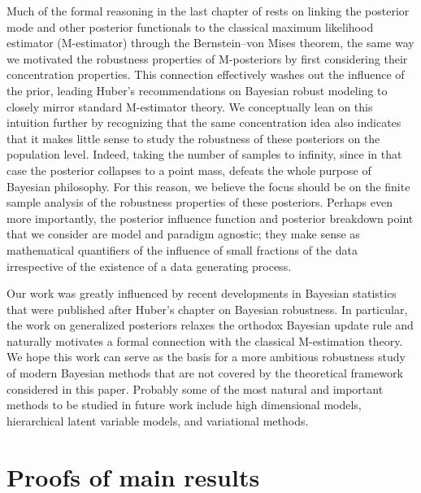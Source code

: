\documentclass[11pt, oneside]{amsart}
\theoremstyle{definition}   %
\begin{document}
Much of the formal reasoning in the last chapter of \cite{huber:ronchetti2009} rests on linking the posterior mode and other posterior functionals to the classical maximum likelihood estimator (M-estimator) through the Bernstein–von Mises theorem, the same way we motivated the robustness properties of M-posteriors by first considering their concentration properties. This connection effectively washes out the influence of the prior, leading Huber's recommendations on Bayesian robust modeling to closely mirror standard M-estimator theory. 
%
We conceptually lean on this intuition further by recognizing that the same concentration idea also indicates that it makes little sense to study the robustness of these posteriors on the population level. Indeed, taking the number of samples to infinity, since in that case the posterior collapses to a point mass, defeats the whole purpose of Bayesian philosophy.  For this reason, we believe the focus should be on the finite sample analysis of the robustness properties of these posteriors.  Perhaps even more importantly, the posterior influence function and posterior breakdown point that we consider are model and paradigm agnostic; they make sense as mathematical quantifiers of the influence of small fractions of the data irrespective of the existence of a data generating process. 

Our work was greatly influenced by recent developments in Bayesian statistics that were published after Huber's chapter on Bayesian robustness. In particular, the work on generalized posteriors \citep{hooker:vidyashankar2014, bissiri:holmes:walker2016, ghosh:basu2016, miller2021,matsubara:knoblauch:briol:oates2022} relaxes the orthodox Bayesian update rule and naturally motivates a formal connection with the classical M-estimation theory.  We hope this work can serve as the basis for a more ambitious robustness study of modern Bayesian methods that are not covered by the theoretical framework considered in this paper. Probably some of the most natural and important methods to be studied in future work include high dimensional models, hierarchical latent variable models, and variational methods.
%


\appendix
\renewcommand{\thesection}{\Alph{section}}

\section{Proofs of main results} \label{appendix::proofs-of-main-results}
%
\end{document}

